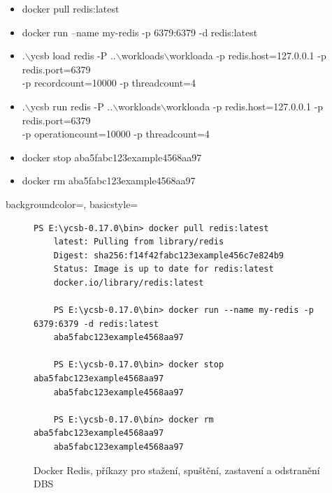 \documentclass[czech,master,dept460,male,csharp,cpdeclaration]{diploma}
\begin{document}
	\begin{itemize}\label{itemiza-docker-ycsb}
		\item docker pull redis:latest
		\item docker run --name my-redis -p 6379:6379 -d redis:latest
		\item .$\backslash$ycsb load redis -P  ..$\backslash$workloads$\backslash$workloada -p redis.host=127.0.0.1 -p redis.port=6379 \\-p recordcount=10000 -p threadcount=4
		\item .$\backslash$ycsb run redis -P ..$\backslash$workloads$\backslash$workloada -p redis.host=127.0.0.1 -p redis.port=6379 \\-p operationcount=10000 -p threadcount=4
		\item docker stop aba5fabc123example4568aa97
		\item docker rm aba5fabc123example4568aa97
	\end{itemize}
	
	{
		backgroundcolor=\color[RGB]{1, 36, 86},
		basicstyle=\scriptsize\color{white}\ttfamily
	}
	
	\begin{figure}
	\centering
	\begin{lstlisting}[style=DOS]
	PS E:\ycsb-0.17.0\bin> docker pull redis:latest
	latest: Pulling from library/redis
	Digest: sha256:f14f42fabc123example456c7e824b9
	Status: Image is up to date for redis:latest
	docker.io/library/redis:latest
		
	PS E:\ycsb-0.17.0\bin> docker run --name my-redis -p 6379:6379 -d redis:latest
	aba5fabc123example4568aa97
		
	PS E:\ycsb-0.17.0\bin> docker stop aba5fabc123example4568aa97
	aba5fabc123example4568aa97
		
	PS E:\ycsb-0.17.0\bin> docker rm aba5fabc123example4568aa97
	aba5fabc123example4568aa97
	\end{lstlisting}
	\caption{Docker Redis, příkazy pro stažení, spuštění, zastavení a odstranění DBS
	\label{ps-docker}}
	\end{figure}
	
\end{document}
